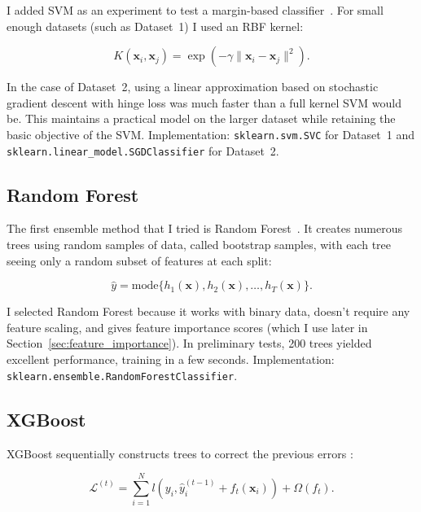 I added SVM as an experiment to test a margin-based classifier~\citep{Cortes1995}. For small enough datasets (such as Dataset~1) I used an RBF kernel:

\begin{equation}
\label{eq:svm_kernel}
K(\mathbf{x}_i, \mathbf{x}_j) = \exp\left(-\gamma \|\mathbf{x}_i - \mathbf{x}_j\|^2\right).
\end{equation}

In the case of Dataset~2, using a linear approximation based on stochastic gradient descent with hinge loss was much faster than a full kernel SVM would be. This maintains a practical model on the larger dataset while retaining the basic objective of the SVM. Implementation: \texttt{sklearn.svm.SVC} for Dataset~1 and \texttt{sklearn.linear\_model.SGDClassifier} for Dataset~2.

\subsection{Random Forest}
\label{sec:random_forest}

The first ensemble method that I tried is Random Forest~\citep{Breiman2001}. It creates numerous trees using random samples of data, called bootstrap samples, with each tree seeing only a random subset of features at each split:

\begin{equation}
\label{eq:random_forest}
\hat{y} = \text{mode}\{h_1(\mathbf{x}), h_2(\mathbf{x}), \ldots, h_T(\mathbf{x})\}.
\end{equation}

I selected Random Forest because it works with binary data, doesn't require any feature scaling, and gives feature importance scores (which I use later in Section~\ref{sec:feature_importance}). In preliminary tests, 200 trees yielded excellent performance, training in a few seconds. Implementation: \texttt{sklearn.ensemble.RandomForestClassifier}.

\subsection{XGBoost}
\label{sec:xgboost}

XGBoost sequentially constructs trees to correct the previous errors \citep{Chen2016}:

\begin{equation}
\label{eq:xgboost}
\mathcal{L}^{(t)} = \sum_{i=1}^{N} l(y_i, \hat{y}_i^{(t-1)} + f_t(\mathbf{x}_i)) + \Omega(f_t).
\end{equation}

